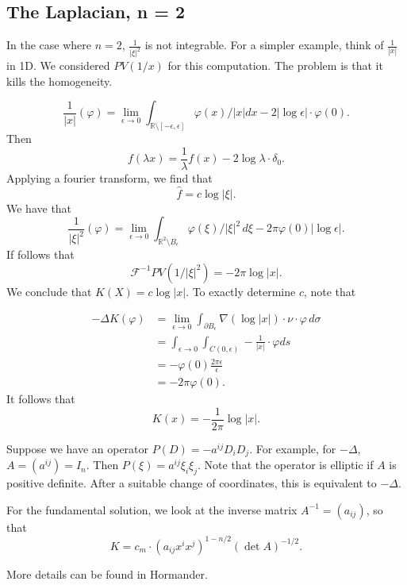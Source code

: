 \documentclass[11pt]{scrartcl}
\newcommand{\R}{\mathbb{R}}
\renewcommand{\hat}{\widehat}
\let \phi \varphi
\begin{document}
\subsection{The Laplacian, n = 2}
In the case where $n = 2$, $\frac{1}{|\xi|^2}$ is not integrable.  For a simpler example, think of $\frac{1}{|x|}$ in 1D.  We considered $PV(1/x)$ for this computation.  The problem is that it kills the homogeneity.  

$$\frac{1}{|x|} (\phi) = \lim_{\epsilon \to 0} \int_{\R \setminus [-\epsilon, \epsilon]} \phi(x)/|x|dx - 2|\log \epsilon| \cdot \phi(0).$$
Then 
$$f(\lambda x) = \frac{1}{\lambda }f(x) - 2\log \lambda \cdot \delta_0.$$
Applying a fourier transform, we find that 
$$\hat{f} = c \log |\xi|.$$
We have that 
$$\frac{1}{|\xi|^2}(\phi) = \lim_{\epsilon \to 0} \int_{\R^2 \setminus B_\epsilon} \phi(\xi)/|\xi|^2 \, d\xi - 2\pi \phi(0) |\log \epsilon|.$$
If follows that 
$$\mathcal F^{-1} PV(1/|\xi|^2) = - 2\pi \log |x|.$$
We conclude that $K(X) = c \log |x|$.  To exactly determine $c$, note that 

\begin{align*}
- \Delta K(\phi)&= \lim_{\epsilon \to 0} \int_{\partial B_\epsilon} \nabla (\log |x|)\cdot \nu \cdot \phi\,  d\sigma \\
&= \int_{\epsilon \to 0} \int_{C(0, \epsilon)} -\frac{1}{|x|} \cdot \phi ds \\
&= -\phi(0) \frac{2\pi \epsilon}{\epsilon}\\
&= -2\pi \phi(0). 
\end{align*}
It follows that 
$$K(x) = -\frac{1}{2\pi} \log|x|.$$
\begin{example}
Suppose we have an operator $P(D) = - a^{ij}D_iD_j.$  For example, for $-\Delta$, $A = (a^{ij}) = I_n$.  Then $P(\xi) = a^{ij} \xi_i \xi_j$.  Note that the operator is elliptic if $A$ is positive definite.  After a suitable change of coordinates, this is equivalent to $-\Delta$.

For the fundamental solution, we look at the inverse matrix $A^{-1} = (a_{ij})$, so that 
$$K = c_m \cdot (a_{ij} x^i x^j)^{1-n/2} (\det A)^{-1/2}.$$

More details can be found in Hormander.
\end{example}
\end{document}
